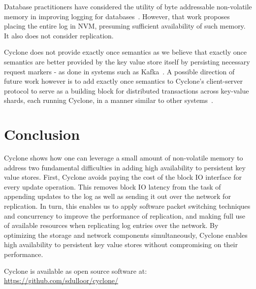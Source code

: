 \documentclass[twocolumn]{article}
\begin{document}

Database practitioners have considered the utility of byte addressable
non-volatile memory in improving logging for
databases~\cite{nvram_log}. However, that work proposes placing the entire log
in NVM, presuming sufficient availability of such memory. It also does not
consider replication.

Cyclone does not provide exactly once semantics as we
believe that exactly once semantics are better provided by the key value store
itself by persisting necessary request markers - as done in systems such as
Kafka~\cite{kafka}. A possible direction of future work however is to add
exactly once semantics to Cyclone's client-server protocol to serve as a
building block for distributed transactions across key-value shards, each
running Cyclone, in a manner similar to other systems~\cite{raft_lin}.

\section{Conclusion}
Cyclone shows how one can leverage a small amount of non-volatile memory to
address two fundamental difficulties in adding high availability to persistent
key value stores. First, Cyclone avoids
paying the cost of the block IO interface for every update operation. This
removes block IO latency from the task of appending updates to the log as well
as sending it out over the network for replication. In turn, this enables us to
apply software packet switching techniques and concurrency to improve the
performance of replication, and making full use of available resources when
replicating log entries over the network. By optimizing the storage and network
components simultaneously, Cyclone enables high availability to persistent key
value stores without compromising on their performance.

Cyclone is available as open source software at:\\
\url{https://github.com/sdulloor/cyclone/}
\newcommand\myurl[2]{\url{#1}}


\end{document}
